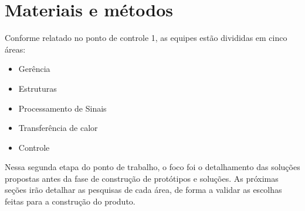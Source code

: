 \chapter{Materiais e métodos}

Conforme relatado no ponto de controle 1, as equipes estão divididas em cinco áreas:
\begin{itemize}
\item Gerência
\item Estruturas
\item Processamento de Sinais
\item Transferência de calor
\item Controle
\end{itemize}

Nessa segunda etapa do ponto de trabalho, o foco foi o detalhamento das soluções propostas antes da fase de construção de protótipos e soluções. As próximas seções irão detalhar as pesquisas de cada área, de forma a validar as escolhas feitas para a construção do produto.
